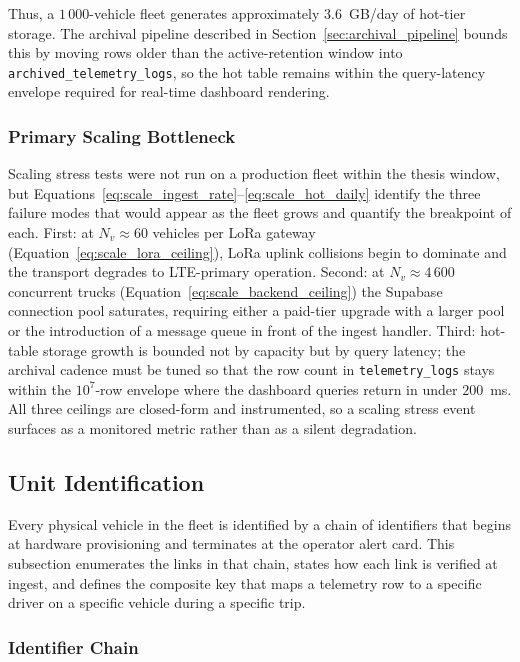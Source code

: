 \vspace{0.5em}
Thus, a $1\,000$-vehicle fleet generates approximately $3.6$~GB/day of hot-tier storage. The archival pipeline described in Section~\ref{sec:archival_pipeline} bounds this by moving rows older than the active-retention window into \texttt{archived\_telemetry\_logs}, so the hot table remains within the query-latency envelope required for real-time dashboard rendering.

\subsubsection{Primary Scaling Bottleneck}
\label{sec:scale_break_first}

Scaling stress tests were not run on a production fleet within the thesis window, but Equations~\ref{eq:scale_ingest_rate}--\ref{eq:scale_hot_daily} identify the three failure modes that would appear as the fleet grows and quantify the breakpoint of each. First: at $N_v \approx 60$ vehicles per LoRa gateway (Equation~\ref{eq:scale_lora_ceiling}), LoRa uplink collisions begin to dominate and the transport degrades to LTE-primary operation. Second: at $N_v \approx 4\,600$ concurrent trucks (Equation~\ref{eq:scale_backend_ceiling}) the Supabase connection pool saturates, requiring either a paid-tier upgrade with a larger pool or the introduction of a message queue in front of the ingest handler. Third: hot-table storage growth is bounded not by capacity but by query latency; the archival cadence must be tuned so that the row count in \texttt{telemetry\_logs} stays within the $10^{7}$-row envelope where the dashboard queries return in under $200$~ms. All three ceilings are closed-form and instrumented, so a scaling stress event surfaces as a monitored metric rather than as a silent degradation.

\subsection{Unit Identification}
\label{sec:unit_identification}

Every physical vehicle in the fleet is identified by a chain of identifiers that begins at hardware provisioning and terminates at the operator alert card. This subsection enumerates the links in that chain, states how each link is verified at ingest, and defines the composite key that maps a telemetry row to a specific driver on a specific vehicle during a specific trip.

\subsubsection{Identifier Chain}
\label{sec:unit_id_chain}

